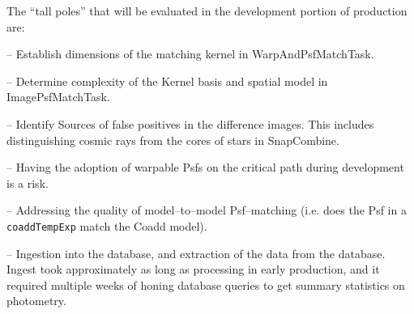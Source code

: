 \documentclass[prd, nofootinbib, floatfix, 11pt,tightenlines,times]{article}
\begin{document}
The ``tall poles'' that will be evaluated in the development portion of production are:

-- Establish dimensions of the matching kernel in WarpAndPsfMatchTask.

-- Determine complexity of the Kernel basis and spatial model in
ImagePsfMatchTask.

-- Identify Sources of false positives in the difference images.  This
includes distinguishing cosmic rays from the cores of stars in
SnapCombine.

-- Having the adoption of warpable Psfs on the critical path during
development is a risk.

-- Addressing the quality of model--to--model Psf--matching (i.e. does
the Psf in a {\tt coaddTempExp} match the Coadd model).
 
-- Ingestion into the database, and extraction of the data from the
database.  Ingest took approximately as long as processing in early
production, and it required multiple weeks of honing database queries
to get summary statistics on photometry.


\clearpage 
\end{document}
